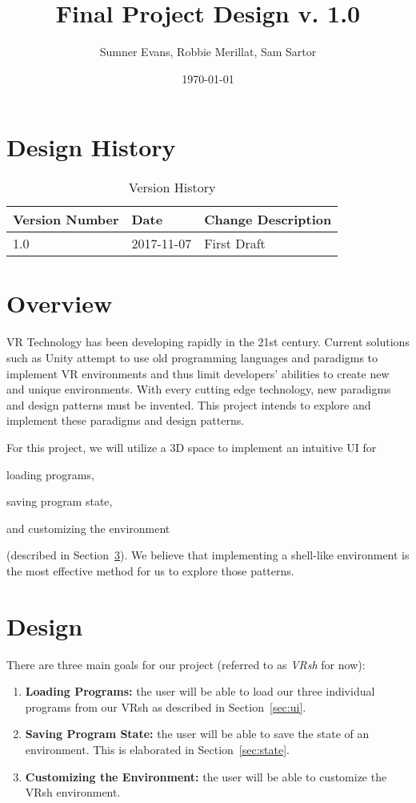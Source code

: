 \documentclass[titlepage,12pt]{article}
\title{Final Project Design v. 1.0}
\author{Sumner Evans, Robbie Merillat, Sam Sartor}
\date{\today}
\newcommand\name{VRsh\xspace}
\begin{document}
\maketitle

\section{Design History}
\begin{table}[H]
    \caption{Version History}
    \label{tbl:version_history}
    \centering
    \begin{tabularx}{\linewidth}{| l | l || X |}
        \hline
        \textbf{Version Number} & \textbf{Date} & \textbf{Change Description} \\
        \hline\hline
        1.0 & 2017-11-07 & First Draft \\
        \hline
    \end{tabularx}
\end{table}

\section{Overview}
VR Technology has been developing rapidly in the 21st century. Current solutions
such as Unity attempt to use old programming languages and paradigms to
implement VR environments and thus limit developers' abilities to create new and
unique environments. With every cutting edge technology, new paradigms and
design patterns must be invented. This project intends to explore and implement
these paradigms and design patterns.

For this project, we will utilize a 3D space to implement an intuitive UI for
\begin{enumerate*}
\item loading programs,
\item saving program state,
\item and customizing the environment
\end{enumerate*} (described in Section~\ref{sec:design}).  We believe that
implementing a shell-like environment is the most effective method for us to
explore those patterns.

\section{Design}\label{sec:design}
There are three main goals for our project (referred to as \textit{\name} for
now):
\begin{enumerate}
    \item \textbf{Loading Programs:} the user will be able to load our three
        individual programs from our \name as described in Section~\ref{sec:ui}.
    \item \textbf{Saving Program State:} the user will be able to save the state
        of an environment. This is elaborated in Section~\ref{sec:state}.
    \item \textbf{Customizing the Environment:} the user will be able to
        customize the \name environment.
\end{enumerate}
\end{document}
